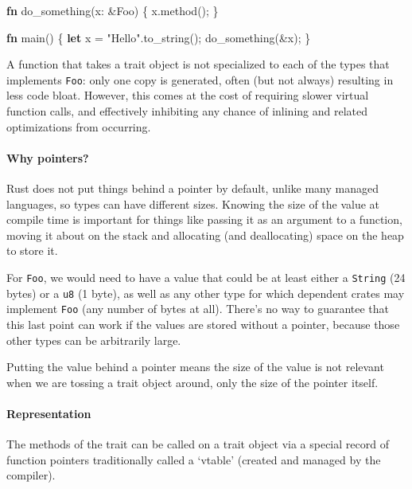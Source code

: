 \documentclass[a4paper,]{book}
\newenvironment{Shaded}{\begin{snugshade}}{\end{snugshade}}
\newcommand{\KeywordTok}[1]{\textcolor[rgb]{0.13,0.29,0.53}{\textbf{{#1}}}}
\newcommand{\StringTok}[1]{\textcolor[rgb]{0.31,0.60,0.02}{{#1}}}
\newcommand{\NormalTok}[1]{{#1}}
\begin{document}
\begin{Shaded}
\begin{Highlighting}[]

\KeywordTok{fn} \NormalTok{do_something(x: &Foo) \{}
    \NormalTok{x.method();}
\NormalTok{\}}

\KeywordTok{fn} \NormalTok{main() \{}
    \KeywordTok{let} \NormalTok{x = }\StringTok{"Hello"}\NormalTok{.to_string();}
    \NormalTok{do_something(&x);}
\NormalTok{\}}
\end{Highlighting}
\end{Shaded}

A function that takes a trait object is not specialized to each of the
types that implements \texttt{Foo}: only one copy is generated, often
(but not always) resulting in less code bloat. However, this comes at
the cost of requiring slower virtual function calls, and effectively
inhibiting any chance of inlining and related optimizations from
occurring.

\paragraph{Why pointers?}\label{why-pointers}

Rust does not put things behind a pointer by default, unlike many
managed languages, so types can have different sizes. Knowing the size
of the value at compile time is important for things like passing it as
an argument to a function, moving it about on the stack and allocating
(and deallocating) space on the heap to store it.

For \texttt{Foo}, we would need to have a value that could be at least
either a \texttt{String} (24 bytes) or a \texttt{u8} (1 byte), as well
as any other type for which dependent crates may implement \texttt{Foo}
(any number of bytes at all). There's no way to guarantee that this last
point can work if the values are stored without a pointer, because those
other types can be arbitrarily large.

Putting the value behind a pointer means the size of the value is not
relevant when we are tossing a trait object around, only the size of the
pointer itself.

\paragraph{Representation}\label{representation}

The methods of the trait can be called on a trait object via a special
record of function pointers traditionally called a `vtable' (created and
managed by the compiler).
\end{document}
